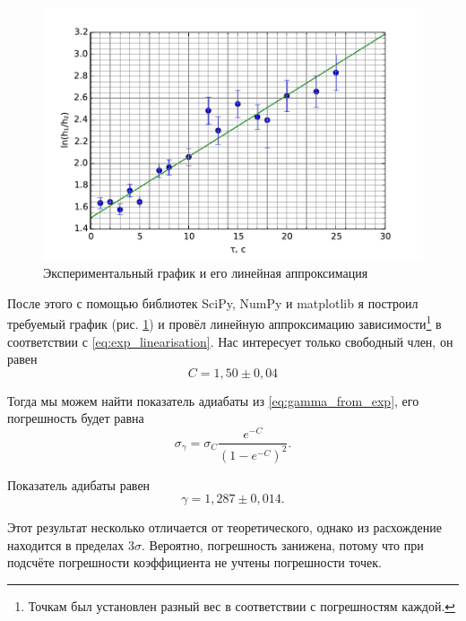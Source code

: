 \documentclass[12pt]{article}
\begin{document}
	\begin{figure}[h!]
	\caption{Экспериментальный график и его линейная аппроксимация}
	\label{fig:graph}
	\begin{center}
	\includegraphics[scale=1]{graph.pdf}
	\end{center}
	\end{figure}
	
	После этого с помощью библиотек SciPy, NumPy и matplotlib я построил требуемый график (рис. \ref{fig:graph}) и провёл линейную аппроксимацию зависимости\footnote{Точкам был установлен разный вес в соответствии с погрешностям каждой.} в соответствии с \eqref{eq:exp_linearisation}. Нас интересует только свободный член, он равен
	\begin{equation}
	\label{eq:exp_coeff_result}
	C=1{,}50\pm 0{,}04
	\end{equation}
	
	Тогда мы можем найти показатель адиабаты из \eqref{eq:gamma_from_exp}, его погрешность будет равна
	\begin{equation}
	\label{eq:s_gamma}
	\sigma_\gamma=\sigma_C \frac{e^{-C}}{\left( 1-e^{-C} \right)^2}.
	\end{equation}
	
	Показатель адибаты равен
	\begin{equation}
	\label{eq:exp_gamma_result}
	\gamma=1{,}287\pm 0{,}014.
	\end{equation}
	
	Этот результат несколько отличается от теоретического, однако из расхождение находится в пределах $3\sigma$. Вероятно, погрешность занижена, потому что при подсчёте погрешности коэффициента не учтены погрешности точек.
\end{document}
